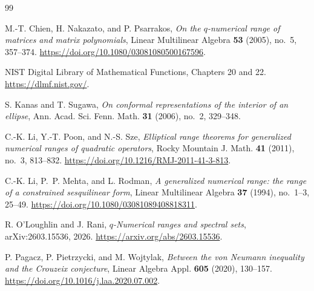 \documentclass[11pt]{article}
\theoremstyle{remark}
\begin{document}
\begin{thebibliography}{99}

M.-T. Chien, H. Nakazato, and P. Psarrakos,
\emph{On the \(q\)-numerical range of matrices and matrix
polynomials},
Linear Multilinear Algebra \textbf{53} (2005), no.~5, 357--374.
\url{https://doi.org/10.1080/03081080500167596}.

NIST Digital Library of Mathematical Functions,
Chapters 20 and 22.
\url{https://dlmf.nist.gov/}.

S. Kanas and T. Sugawa,
\emph{On conformal representations of the interior of an ellipse},
Ann. Acad. Sci. Fenn. Math. \textbf{31} (2006), no.~2, 329--348.

C.-K. Li, Y.-T. Poon, and N.-S. Sze,
\emph{Elliptical range theorems for generalized numerical ranges of
quadratic operators},
Rocky Mountain J. Math. \textbf{41} (2011), no.~3, 813--832.
\url{https://doi.org/10.1216/RMJ-2011-41-3-813}.

C.-K. Li, P.~P. Mehta, and L. Rodman,
\emph{A generalized numerical range: the range of a constrained
sesquilinear form},
Linear Multilinear Algebra \textbf{37} (1994), no.~1--3, 25--49.
\url{https://doi.org/10.1080/03081089408818311}.

R. O'Loughlin and J. Rani,
\emph{\(q\)-Numerical ranges and spectral sets},
arXiv:2603.15536, 2026.
\url{https://arxiv.org/abs/2603.15536}.

P. Pagacz, P. Pietrzycki, and M. Wojtylak,
\emph{Between the von Neumann inequality and the Crouzeix
conjecture},
Linear Algebra Appl. \textbf{605} (2020), 130--157.
\url{https://doi.org/10.1016/j.laa.2020.07.002}.

\end{thebibliography}
\end{document}
